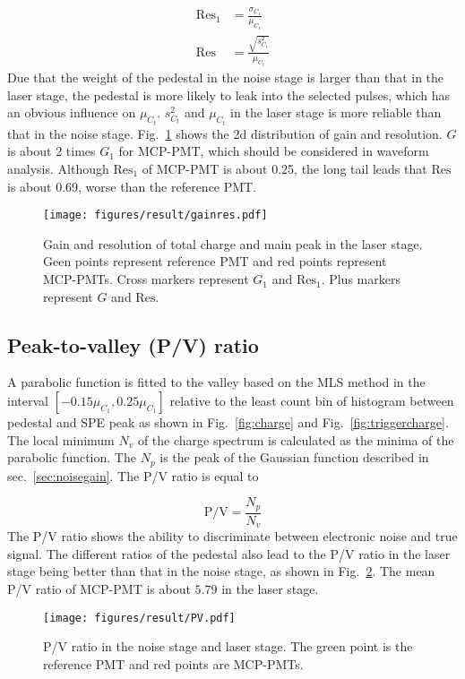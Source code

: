\begin{align}
    \mathrm{Res}_1&=\frac{\sigma_{C_1}}{\mu_{C_1}}\\
    \mathrm{Res}&=\frac{\sqrt{s^2_{C_t}}}{\mu_{C_t}}
\end{align}
Due that the weight of the pedestal in the noise stage is larger than that in the laser stage, the pedestal is more likely to leak into the selected pulses, which has an obvious influence on $\mu_{C_t}$. $s^2_{C_t}$ and $\mu_{C_t}$ in the laser stage is more reliable than that in the noise stage. Fig.~\ref{fig:totalchargeCompare} shows the 2d distribution of gain and resolution.
$G$ is about 2 times $G_1$ for MCP-PMT, which should be considered in waveform analysis. Although $\mathrm{Res}_1$ of MCP-PMT is about 0.25, the long tail leads that $\mathrm{Res}$ is about 0.69, worse than the reference PMT.

\begin{figure}[!htbp]
    \centering
    \texttt{[image: figures/result/gainres.pdf]}
    \caption{Gain and resolution of total charge and main peak in the laser stage. Geen points represent reference PMT and red points represent MCP-PMTs. Cross markers represent $G_1$ and $\mathrm{Res}_1$. Plus markers represent $G$ and $\mathrm{Res}$.}
    \label{fig:totalchargeCompare}
\end{figure}

\subsection{Peak-to-valley (P/V) ratio}
A parabolic function is fitted to the valley based on the MLS method in the interval $[-0.15\mu_{C_1}, 0.25\mu_{C_1}]$ relative to the least count bin of histogram between pedestal and SPE peak as shown in Fig.~\ref{fig:charge} and Fig.~\ref{fig:triggercharge}. The local minimum $N_v$ of the charge spectrum is calculated as the minima of the parabolic function. The $N_p$ is the peak of the Gaussian function described in sec.~\ref{sec:noisegain}. The P/V ratio is equal to

\begin{equation}
    \mathrm{P/V}=\frac{N_p}{N_v}
\end{equation}
The P/V ratio shows the ability to discriminate between electronic noise and true signal. The different ratios of the pedestal also lead to the P/V ratio in the laser stage being better than that in the noise stage, as shown in Fig.~\ref{fig:PVCompare}. The mean P/V ratio of MCP-PMT is about $5.79$ in the laser stage.
\begin{figure}[!htbp]
    \centering
    \texttt{[image: figures/result/PV.pdf]}
    \caption{P/V ratio in the noise stage and laser stage. The green point is the reference PMT and red points are MCP-PMTs.} 
    \label{fig:PVCompare}
\end{figure}

